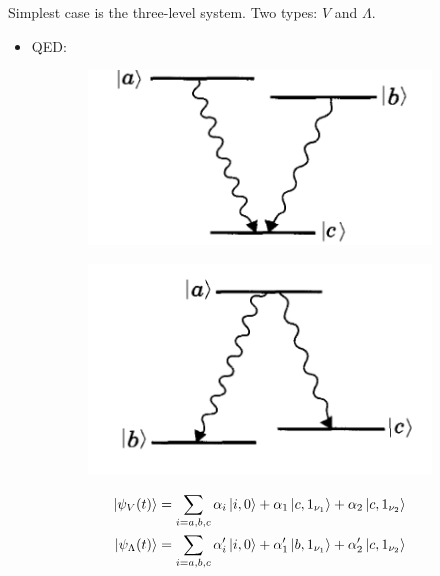 \documentclass{beamer}
\theoremstyle{definition}
\newcommand{\al}{\alpha}
\begin{document}
\begin{frame}



Simplest case is the three-level system. Two types: $V$ and $\Lambda$.


\begin{itemize}
	\item QED:
\end{itemize}




\begin{figure}[!htb]
	\begin{subfigure}{0.4\textwidth}
		\includegraphics[width=\textwidth]{V.png}
	\end{subfigure}
	\begin{subfigure}{0.4\textwidth}
		\includegraphics[width=\textwidth]{A.png}
	\end{subfigure}
\end{figure}


\begin{align*}
\ket{\psi_V(t)} &=  \sum_{i=a,b,c} \al_i \ket{i,0} + \al_1\ket{c,1_{\nu_1}} + \al_2 \ket{c,1_{\nu_2}}\\
\ket{\psi_\Lambda(t)} &=  \sum_{i=a,b,c} \al_i' \ket{i,0} + \al_1'\ket{b,1_{\nu_1}} + \al_2' \ket{c,1_{\nu_2}}
\end{align*}

\end{frame}
\end{document}
